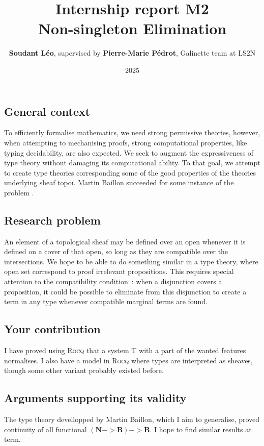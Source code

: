 \documentclass[11pt]{article}
\title{Internship report M2\\  Non-singleton Elimination\\}
\author{\textbf{Soudant L\'eo}, supervised by \textbf{Pierre-Marie P\'edrot}, Galinette team at LS2N}
\date{2025}
\newcommand{\0}{\mathbf{0}}
\newcommand{\1}{\mathbf{1}}
\newcommand{\nat}{\mathbf{N}}
\newcommand{\bool}{\mathbf{B}}
\begin{document}
\begin{titlepage}
    
\maketitle

\end{titlepage}


\subsection*{General context}
To efficiently formalise mathematics, we need strong permissive theories, however, when attempting to mechanising proofs, strong computational properties, like typing decidability, are also expected.
We seek to augment the expressiveness of type theory without damaging its computational ability.
To that goal, we attempt to create type theories corresponding some of the good properties of the theories underlying sheaf topoï. Martin Baillon succeeded for some instance of the problem \cite{baillon:tel-04617881}.
\subsection*{Research problem}
An element of a topological sheaf may be defined over an open whenever it is defined on a cover of that open, so long as they are compatible over the intersections.
We hope to be able to do something similar in a type theory, where open set correspond to proof irrelevant propositions.
This requires special attention to the compatibility condition~: when a disjunction covers a proposition, it could be possible to eliminate from this disjunction to create a term in any type whenever compatible marginal terms are found.
\subsection*{Your contribution}
I have proved using \textsc{Rocq} that a system T with a part of the wanted features normalises. I also have a model in \textsc{Rocq} where types are interpreted as sheaves, though some other variant probably existed before.
\subsection*{Arguments supporting its validity}
The type theory devellopped by Martin Baillon, which I aim to generalise, proved continuity of all functional $(\nat -> \bool) -> \bool$. I hope to find similar results at term.
\end{document}
